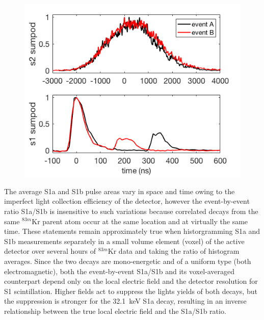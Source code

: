 \begin{figure}
\includegraphics[scale=0.4]{figures/Fig2.png}
 \label{fig:Sumpod}
\end{figure}


The average S1a and S1b pulse areas vary in space and time owing to the imperfect light collection
efficiency of the detector, however the event-by-event ratio
S1a/S1b is insensitive to such variations because correlated decays from the same $^{83m}$Kr 
parent atom occur at the same location and at virtually the same time. 
These statements remain approximately true 
when historgramming S1a and S1b measurements separately 
in a small volume element (voxel) of the active detector over several hours of $^{83m}$Kr data
and taking the ratio of histogram averages.
Since the two decays are mono-energetic
and of a uniform type (both electromagnetic), both the event-by-event S1a/S1b 
and its voxel-averaged counterpart depend only on 
the local electric field and the detector resolution for S1 scintillation. 
Higher fields act to suppress the lights yields of both decays, but the suppression is stronger
for the 32.1~keV S1a decay, resulting in an inverse relationship between the true local 
electric field and the S1a/S1b ratio. 

